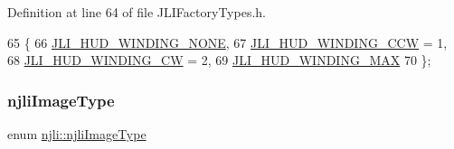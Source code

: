 Definition at line 64 of file J\+L\+I\+Factory\+Types.\+h.


\begin{DoxyCode}
65   \{
66     \mbox{\hyperlink{namespacenjli_adfddace364f1f59d370037cf6f934456a06a1267bcbee6a7d982be897f3f3deca}{JLI\_HUD\_WINDING\_NONE}},
67     \mbox{\hyperlink{namespacenjli_adfddace364f1f59d370037cf6f934456a1853c6b1a27c59cf3203ad13555929d7}{JLI\_HUD\_WINDING\_CCW}} = 1,
68     \mbox{\hyperlink{namespacenjli_adfddace364f1f59d370037cf6f934456a87eb938f9a0d3e093c23b40739b2a689}{JLI\_HUD\_WINDING\_CW}} = 2,
69     \mbox{\hyperlink{namespacenjli_adfddace364f1f59d370037cf6f934456ad6d17a18f249cc31829f0d0ed78a7c82}{JLI\_HUD\_WINDING\_MAX}}
70   \};
\end{DoxyCode}
\mbox{\label{namespacenjli_a709a24b63b768ce1cdff54f7f48d3c0b}} 
\subsubsection{\texorpdfstring{njli\+Image\+Type}{njliImageType}}
{\footnotesize\ttfamily enum \mbox{\hyperlink{namespacenjli_a709a24b63b768ce1cdff54f7f48d3c0b}{njli\+::njli\+Image\+Type}}}


